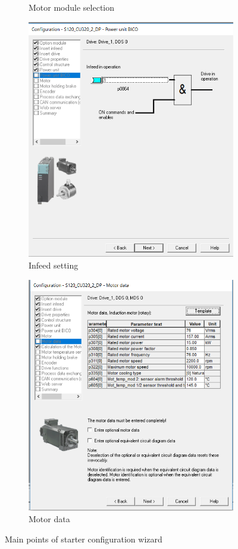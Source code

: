 \begin{figure}
\begin{subfigure}{0.32\linewidth}
		\caption{Motor module selection}
	\end{subfigure}
	\hfill
	\begin{subfigure}{0.32\linewidth}
		\centering
		\includegraphics[width=0.8\linewidth]{figures/starter_04}
		\caption{Infeed setting}
	\end{subfigure}
	\hfill
	\begin{subfigure}{0.32\linewidth}
		\centering
		\includegraphics[width=0.8\linewidth]{figures/starter_05}
		\caption{Motor data}
	\end{subfigure}
\caption{Main points of starter configuration wizard}
\label{fig:starter_config}
\end{figure}

